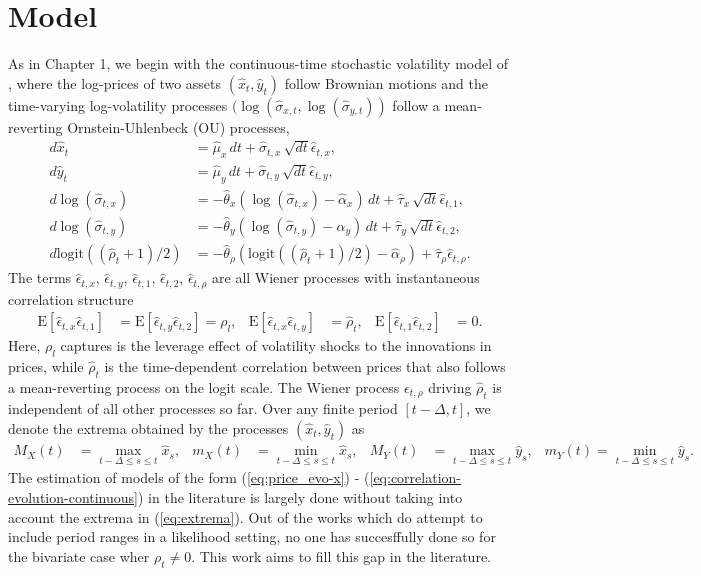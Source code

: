 \documentclass[10pt]{article}
\newcommand{\E}[1]{\mbox{E}\left[#1\right]}
\begin{document}
\section{Model}
As in Chapter 1, we begin with the continuous-time stochastic
volatility model of \cite{hull1987pricing}, where the log-prices of two assets
$(\hat{x}_t, \hat{y}_t)$ follow Brownian motions and the
time-varying log-volatility processes $(\log(\hat{\sigma}_{x,t}, \log(\hat{\sigma}_{y,t}))$ follow a
mean-reverting Ornstein-Uhlenbeck (OU) processes,
\begin{align}
  d\hat{x}_t &= \hat{\mu}_x\, dt + \hat{\sigma}_{t,x}\, \sqrt{dt} \hat{\epsilon}_{t,x}  ,  \label{eq:price_evo-x} \\
  d\hat{y}_t &= \hat{\mu}_y\, dt + \hat{\sigma}_{t,y}\, \sqrt{dt} \hat{\epsilon}_{t,y}  ,  \label{eq:price_evo-y} \\
  d\log( \hat{ \sigma }_{t,x}) &= -\hat{\theta}_x ( \log(\hat{\sigma}_{t,x} ) - \hat{\alpha}_x )\, dt + \hat{\tau}_x\, \sqrt{dt} \hat{\epsilon}_{t,1}  ,  \label{eq:vol_evo-x} \\
  d\log( \hat{ \sigma }_{t,y}) &= -\hat{\theta}_y ( \log(\hat{\sigma}_{t,y} ) - \hat{\alpha}_y )\, dt + \hat{\tau}_y\, \sqrt{dt} \hat{\epsilon}_{t,2}  ,  \label{eq:vol_evo-y} \\
  d\mbox{logit}((\hat{\rho}_{t} + 1)/2) &= -\hat{\theta}_\rho\left(\mbox{logit}((\hat{\rho}_{t}+1)/2) - \hat{\alpha}_\rho\right) + \hat{\tau}_{\rho} \hat{\epsilon}_{t,\rho}. \label{eq:correlation-evolution-continuous}
\end{align}
The terms $\hat{\epsilon}_{t,x}$, $\hat{\epsilon}_{t,y}$,
$\hat{\epsilon}_{t,1}$, $\hat{\epsilon}_{t,2}$, $\hat{\epsilon}_{t,\rho}$ are all Wiener
processes with instantaneous correlation structure 
\begin{align*}
  \E{\hat{\epsilon}_{t,x}\hat{\epsilon}_{t,1}} &= \E{\hat{\epsilon}_{t,y}\hat{\epsilon}_{t,2}} = \rho_{l}, & \E{\hat{\epsilon}_{t,x}\hat{\epsilon}_{t,y}} &= \hat{\rho}_t, & \E{\hat{\epsilon}_{t,1}\hat{\epsilon}_{t,2}} &= 0.
\end{align*}
Here, $\rho_l$ captures is the leverage effect of volatility shocks to
the innovations in prices, while $\hat{\rho}_t$ is the time-dependent
correlation between prices that also follows a mean-reverting process
on the logit scale. The Wiener process $\epsilon_{t,\rho}$ driving
$\hat{\rho}_t$ is independent of all other processes so far. Over any
finite period $[t-\Delta, t]$, we denote the extrema obtained by the
processes $(\hat{x}_t, \hat{y}_t)$ as
\begin{align}
M_X(t) &=\max_{t-\Delta\leq s\leq t}\hat{x}_s, & m_X(t) &=\min_{t-\Delta\leq s\leq t}\hat{x}_s, &
M_Y(t) &=\max_{t-\Delta\leq s\leq t}\hat{y}_s, & m_Y(t)=\min_{t-\Delta \leq s\leq t}\hat{y}_s. \label{eq:extrema}
\end{align}
The estimation of models of the form (\ref{eq:price_evo-x}) -
(\ref{eq:correlation-evolution-continuous}) in the literature is
largely done without taking into account the extrema in
(\ref{eq:extrema}). Out of the works which do attempt to include
period ranges in a likelihood setting, no one has succesffully done so
for the bivariate case wher $\rho_t \neq 0$. This work aims to fill
this gap in the literature. 
\end{document}
